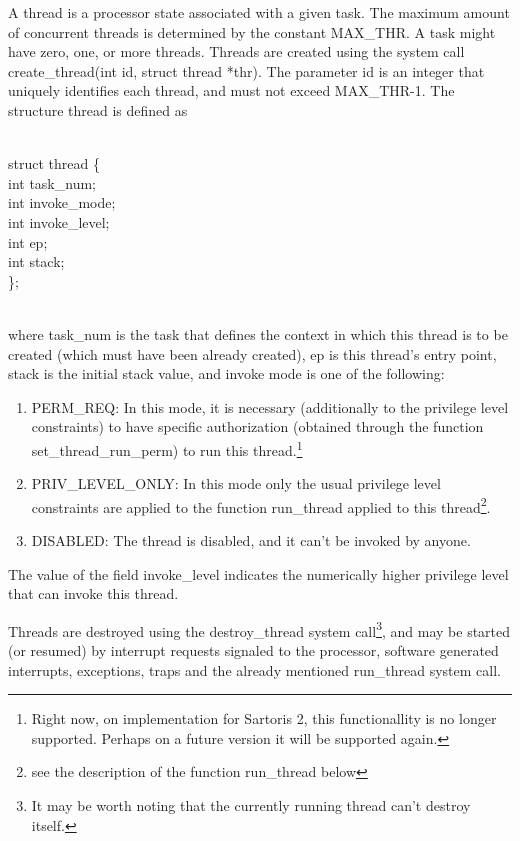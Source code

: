 \documentclass[11pt, letterpaper, twoside, english]{book}
\begin{document}
A thread is a processor state associated with a given task. The maximum amount of concurrent threads is determined by the constant \textsf{MAX\_THR}. A task might have zero, one, or more threads. Threads are created using the system call \textsf{create\_thread(int id, struct thread *thr)}. The parameter \textsf{id} is an integer that uniquely identifies each thread, and must not exceed \textsf{MAX\_THR}-1. The structure \textsf{thread} is defined as \\
\\
\begin{sf} \noindent struct thread \{ \\
\indent  int task\_num; \\
\indent  int invoke\_mode; \\
\indent  int invoke\_level; \\
\indent  int ep; \\
\indent  int stack; \\
\}; \\
\end{sf}
\\
where \textsf{task\_num} is the task that defines the context in which this thread is to be created (which must have been already created), \textsf{ep} is this thread's entry point, \textsf{stack} is the initial stack value, and invoke mode is one of the following:
\begin{enumerate}
\item[] \textsf{PERM\_REQ}: In this mode, it is necessary (additionally to the privilege level constraints) to have specific authorization (obtained through the function \textsf{set\_thread\_run\_perm}) to run this thread.\footnote{Right now, on implementation for Sartoris 2, this functionallity is no longer supported. Perhaps on a future version it will be supported again.}
\item[] \textsf{PRIV\_LEVEL\_ONLY}: In this mode only the usual privilege level constraints are applied to the function \textsf{run\_thread} applied to this thread\footnote{see the description of the function \textsf{run\_thread} below}.
\item[] \textsf{DISABLED}: The thread is disabled, and it can't be invoked by anyone.
\end{enumerate}
The value of the field \textsf{invoke\_level} indicates the numerically higher privilege level that can invoke this thread. 


Threads are destroyed using the \textsf{destroy\_thread} system call\footnote{It may be worth noting that the currently running thread can't destroy itself.}, and may be started (or resumed) by interrupt requests signaled to the processor, software generated interrupts, exceptions, traps and the already mentioned \textsf{run\_thread} system call.
\end{document}
